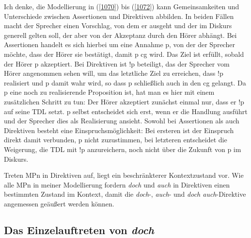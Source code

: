 {Ich denke, die Modellierung in (\ref{1070}) bis (\ref{1072}) kann Gemeinsamkeiten und Unterschiede zwischen Assertionen  und Direktiven  abbilden. In beiden Fällen macht der Sprecher einen Vorschlag, von dem er ausgeht und der im Diskurs generell gelten soll, der aber von der Akzeptanz durch den Hörer abhängt. Bei Assertionen handelt es sich hierbei um eine Annahme p, von der der Sprecher möchte, dass der Hörer sie bestätigt, damit p cg wird. Das Ziel ist erfüllt, sobald der Hörer p akzeptiert. Bei Direktiven ist !p beteiligt, das der Sprecher vom Hörer angenommen sehen will, um das letztliche Ziel zu erreichen, dass !p realisiert und p damit wahr wird, so dass p schließlich auch in den cg gelangt. Da p eine noch zu rea\-lisierende Proposition ist, hat man es hier mit einem zusätzlichen Schritt zu tun: Der Hörer akzeptiert zunächst einmal nur, dass er !p auf seine TDL setzt. p selbst entscheidet sich erst, wenn er die Handlung ausführt und der Sprecher dies als Realisierung ansieht. Sowohl bei Assertionen als auch Direktiven besteht eine Einspruchsmöglichkeit: Bei ersteren ist der Einspruch direkt damit verbunden, p nicht zuzustimmen, bei letzteren entscheidet die Weigerung, die TDL mit !p anzureichern, noch nicht über die Zukunft von p im Diskurs. 

Treten MPn in Direktiven auf, liegt ein beschränkterer Kontextzustand vor. Wie alle MPn in meiner Modellierung fordern \textit{doch} und \textit{auch} in Direktiven einen bestimmten Zustand im Kontext, damit die \textit{doch}-, \textit{auch}- und \textit{doch auch}-Direktive angemessen geäußert werden können. 

\subsection{Das Einzelauftreten von \textit{doch}}
}
